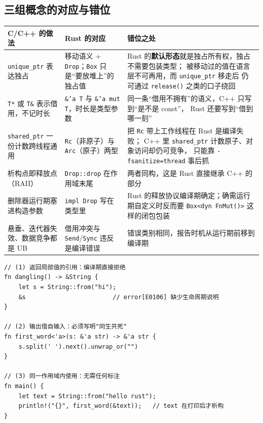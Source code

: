 \documentclass[12pt,a4paper,fontset=fandol]{ctexbook}
\begin{document}
\subsection{三组概念的对应与错位}

\begin{longtable}{@{}>{\raggedright\arraybackslash}p{}>{\raggedright\arraybackslash}p{}>{\raggedright\arraybackslash}p{}@{}}
\toprule
\textbf{C/C++ 的做法} & \textbf{Rust 的对应} & \textbf{错位之处} \\
\midrule
\texttt{unique\_ptr} 表达独占 &
  移动语义 + \texttt{Drop}；\texttt{Box} 只是``要放堆上''的独占值 &
  Rust 的\textbf{默认形态}就是独占所有权，独占不需要包装类型；
  被移动过的值在语言层不可再用，而 \texttt{unique\_ptr} 移走后
  仍可通过 \texttt{release()} 之类的口子绕回 \\
\addlinespace
\texttt{T*} 或 \texttt{T\&} 表示借用，不记时长 &
  \texttt{\&'a T} 与 \texttt{\&'a mut T}，时长是类型参数 &
  同一条``借用不拥有''的语义，C++ 只写到``是不是 const''，
  Rust 还要写到``借到哪一刻'' \\
\addlinespace
\texttt{shared\_ptr} 一份计数跨线程通用 &
  \texttt{Rc}（非原子）与 \texttt{Arc}（原子）两型 &
  把 \texttt{Rc} 带上工作线程在 Rust 是编译失败；
  C++ 里 \texttt{shared\_ptr} 计数原子、对象访问却仍可竞争，
  只能靠 \texttt{-fsanitize=thread} 事后抓 \\
\addlinespace
析构点即释放点（RAII） & \texttt{Drop::drop} 在作用域末尾 &
  两者同构，这是 Rust 直接继承 C++ 的部分 \\
\addlinespace
删除器运行期塞进构造参数 & \texttt{impl Drop} 写在类型里 &
  Rust 的释放协议编译期确定；确需运行期自定义时反而要
  \texttt{Box<dyn FnMut()>} 这样的闭包包装 \\
\addlinespace
悬垂、迭代器失效、数据竞争都是 UB &
  借用冲突与 \texttt{Send}/\allowbreak{}\texttt{Sync} 违反是编译错误 &
  错误类别相同，报告时机从运行期前移到编译期 \\
\bottomrule
\end{longtable}

\begin{lstlisting}[style=ruststyle,caption={Rust 的三种情形：拒绝、标注、推断}]
// (1) 返回局部值的引用：编译期直接拒绝
fn dangling() -> &String {
    let s = String::from("hi");
    &s                        // error[E0106] 缺少生命周期说明
}

// (2) 输出借自输入：必须写明"同生共死"
fn first_word<'a>(s: &'a str) -> &'a str {
    s.split(' ').next().unwrap_or("")
}

// (3) 同一作用域内使用：无需任何标注
fn main() {
    let text = String::from("hello rust");
    println!("{}", first_word(&text));   // text 在打印后才析构
}
\end{lstlisting}
\end{document}
